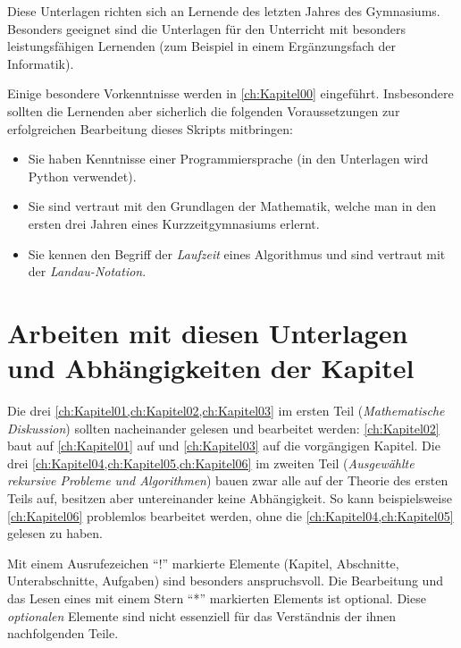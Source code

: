 Diese Unterlagen richten sich an Lernende des letzten Jahres des Gymnasiums. Besonders geeignet sind die Unterlagen für den Unterricht mit besonders leistungsfähigen Lernenden (zum Beispiel in einem Ergänzungsfach der Informatik).

Einige besondere Vorkenntnisse werden in \cref{ch:Kapitel00} eingeführt. Insbesondere sollten die Lernenden aber sicherlich die folgenden Voraussetzungen zur erfolgreichen Bearbeitung dieses Skripts mitbringen:
\begin{itemize}
	\item Sie haben Kenntnisse einer Programmiersprache (in den Unterlagen wird Python verwendet).
	\item Sie sind vertraut mit den Grundlagen der Mathematik, welche man in den ersten drei Jahren eines Kurzzeitgymnasiums erlernt.
	\item Sie kennen den Begriff der \textit{Laufzeit} eines Algorithmus und sind vertraut mit der \textit{Landau-Notation}.
\end{itemize}

\section*{Arbeiten mit diesen Unterlagen und Abhängigkeiten der Kapitel}
Die drei \cref{ch:Kapitel01,ch:Kapitel02,ch:Kapitel03} im ersten Teil (\textit{Mathematische Diskussion}) sollten nacheinander gelesen und bearbeitet werden: \cref{ch:Kapitel02} baut auf \cref{ch:Kapitel01} auf und \cref{ch:Kapitel03} auf die vorgängigen Kapitel. Die drei \cref{ch:Kapitel04,ch:Kapitel05,ch:Kapitel06} im zweiten Teil (\textit{Ausgewählte rekursive Probleme und Algorithmen}) bauen zwar alle auf der Theorie des ersten Teils auf, besitzen aber untereinander keine Abhängigkeit. So kann beispielsweise \cref{ch:Kapitel06} problemlos bearbeitet werden, ohne die \cref{ch:Kapitel04,ch:Kapitel05} gelesen zu haben.

Mit einem Ausrufezeichen \enquote{!} markierte Elemente (Kapitel, Abschnitte, Unterabschnitte, Aufgaben) sind besonders anspruchsvoll. Die Bearbeitung und das Lesen eines mit einem Stern \enquote{*} markierten Elements ist optional. Diese \textit{optionalen} Elemente sind nicht essenziell für das Verständnis der ihnen nachfolgenden Teile.

